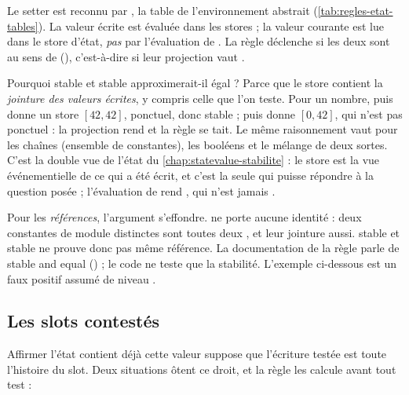 
Le setter est reconnu par , la table de l'environnement abstrait (\cref{tab:regles-etat-tables}). La valeur écrite est évaluée dans les stores ; la valeur courante est lue dans le store d'état, \emph{pas} par l'évaluation de . La règle déclenche si les deux sont  au sens de  (), c'est-à-dire si leur projection  vaut .

Pourquoi \og stable et stable\fg{} approximerait-il \og égal\fg{} ? Parce que le store contient la \emph{jointure des valeurs écrites}, y compris celle que l'on teste. Pour un nombre,  puis  donne un store $[42,42]$, ponctuel, donc stable ;  puis  donne $[0,42]$, qui n'est pas ponctuel : la projection rend  et la règle se tait. Le même raisonnement vaut pour les chaînes (ensemble de constantes), les booléens et le mélange de deux sortes. C'est la double vue de l'état du \cref{chap:statevalue-stabilite} : le store est la vue \og événementielle\fg{} de ce qui a été écrit, et c'est la seule qui puisse répondre à la question posée ; l'évaluation de  rend , qui n'est jamais .

\begin{piege}
Pour les \emph{références}, l'argument s'effondre.  ne porte aucune identité : deux constantes de module distinctes sont toutes deux , et leur jointure aussi. \og stable et stable\fg{} ne prouve donc pas \og même référence\fg. La documentation  de la règle parle de \og stable and equal\fg{} () ; le code ne teste que la stabilité. L'exemple  ci-dessous est un faux positif assumé de niveau \Warning.
\end{piege}

\subsection{Les slots contestés}

Affirmer \og l'état contient déjà cette valeur\fg{} suppose que l'écriture testée est toute l'histoire du slot. Deux situations ôtent ce droit, et la règle les calcule avant tout test :

